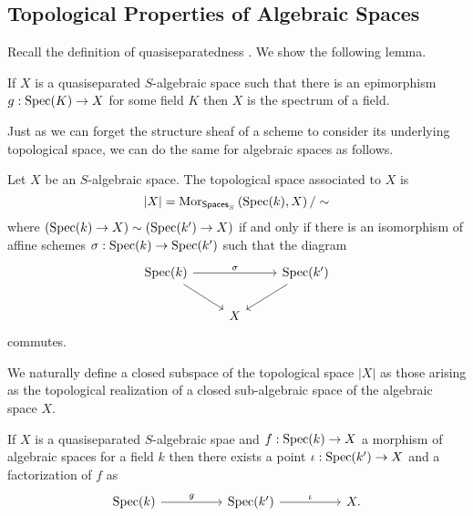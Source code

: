 \subsection{Topological Properties of Algebraic Spaces}
Recall the definition of quasiseparatedness . We show the following lemma. 
\begin{lemma}\label{lem: space is a point}
    If $X$ is a quasiseparated $S$-algebraic space such that there is an epimorphism $g:\operatorname{Spec}(K)\to X$ for some field $K$ then $X$ is the spectrum of a field. 
\end{lemma}
Just as we can forget the structure sheaf of a scheme to consider its underlying topological space, we can do the same for algebraic spaces as follows. 
\begin{definition}\label{def: topological space of algebraic space}
    Let $X$ be an $S$-algebraic space. The topological space associated to $X$ is 
    $$|X|=\mathrm{Mor}_{\mathsf{Spaces}_{S}}\left(\operatorname{Spec}(k), X\right)/\sim$$
    where $(\operatorname{Spec}(k)\to X)\sim(\operatorname{Spec}(k')\to X)$ if and only if there is an isomorphism of affine schemes $\sigma:\operatorname{Spec}(k)\to\operatorname{Spec}(k')$ such that the diagram 
    $$%
    \begin{tikzcd}
        {\spec(k)} && {\spec(k')} \\
        & X
        \arrow[from=1-1, to=2-2]
        \arrow["\sigma", from=1-1, to=1-3]
        \arrow[from=1-3, to=2-2]
    \end{tikzcd}$$
    commutes. 
\end{definition}
We naturally define a closed subspace of the topological space $|X|$ as those arising as the topological realization of a closed sub-algebraic space of the algebraic space $X$. 
\begin{proposition}
    If $X$ is a quasiseparated $S$-algebraic spae and $f:\operatorname{Spec}(k)\to X$ a morphism of algebraic spaces for a field $k$ then there exists a point $\iota:\operatorname{Spec}(k')\to X$ and a factorization of $f$ as 
    $$%
    \begin{tikzcd}
        {\spec(k)} && {\spec(k')} && X.
        \arrow["\iota", from=1-3, to=1-5]
        \arrow["g", from=1-1, to=1-3]
    \end{tikzcd}$$
\end{proposition}
